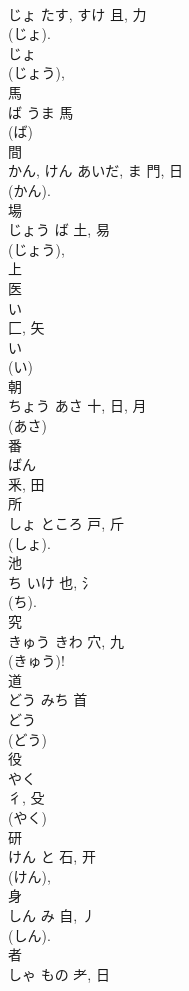 \documentclass[8pt]{extreport}
\begin{document}
\begin{CJK}{UTF8}{min}
\\	じょ	たす, すけ	且, 力	
\\	(じょ).	
\\	じょ 
\\	(じょう), 
\\	馬	
\\	ば	うま	馬	
\\	(ば) 
\\	間	
\\	かん, けん	あいだ, ま	門, 日	
\\	(かん). 
\\	場	
\\	じょう	ば	土, 易	
\\	(じょう), 
\\	上 
\\	医	
\\	い	
\\	匚, 矢	
\\	い 
\\	(い) 
\\	朝	
\\	ちょう	あさ	十, 日, 月	
\\	(あさ) 
\\	番	
\\	ばん	
\\	釆, 田	
\\	所	
\\	しょ	ところ	戸, 斤	
\\	(しょ). 
\\	池	
\\	ち	いけ	也, 氵	
\\	(ち). 
\\	究	
\\	きゅう	きわ	穴, 九	
\\	(きゅう)!	
\\	道	
\\	どう	みち	首		
\\	どう 
\\	(どう) 
\\	役	
\\	やく	
\\	彳, 殳	
\\	(やく) 
\\	研	
\\	けん	と	石, 开	
\\	(けん), 
\\	身	
\\	しん	み	自, 丿	
\\	(しん). 
\\	者	
\\	しゃ	もの	耂, 日	

\end{CJK}
\end{document}

